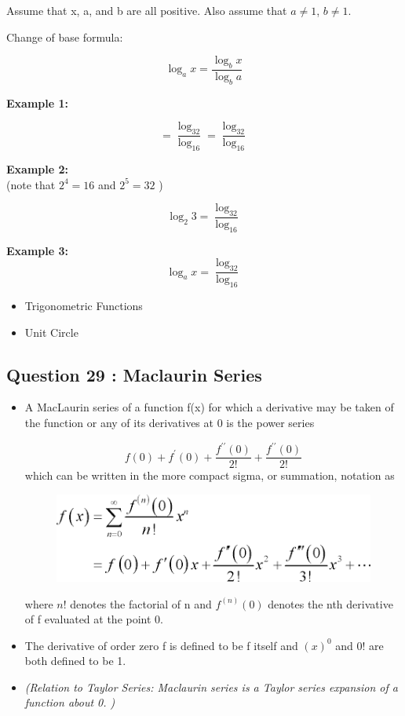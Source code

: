 \documentclass[]{article}
\begin{document}
	
	
	Assume that x, a, and b are all positive. Also assume that $a \neq 1$, $b \neq 1$.
	
	Change of base formula: 
	
	\[  \log_a x =  \frac{\log_{b} x }{ \log_{b} a } \]
	
	\noindent \textbf{Example 1: }
	
	\[  =  \frac{\log_{32} }{ \log_{16} }  =  \frac{\log_{32} }{ \log_{16} } \]
	
	\noindent \textbf{Example 2:  }  \\ (note that $2^{4} = 16$ and $2^{5} = 32$ )
	
	\[  \log_2 3 =  \frac{\log_{32} }{ \log_{16} } \]
	
	
	\noindent \textbf{Example 3: }
	\[  \log_a x =  \frac{\log_{32} }{ \log_{16} } \]
	
	
	
	\bigskip
	
	
	\begin{itemize}
		\item	Trigonometric Functions
		\item   Unit Circle
		
	\end{itemize}

\subsection*{Question 29 : Maclaurin Series}
\begin{itemize}
	\item A MacLaurin series of a function f(x) for which a derivative may be taken of the function or any of its derivatives at 0 is the power series
	
	
	\[f(0) + f^{\prime}(0) + \frac{f^{\prime \prime}(0)}{2!} + \frac{f^{\prime \prime}(0)}{2!} \]
	which can be written in the more compact sigma, or summation, notation as
	\begin{figure}[h!]
		\centering
		\includegraphics[width=0.25\linewidth]{MaclaurinFormula.png}
	\end{figure}
	
	where $n!$ denotes the factorial of n and $f^{(n)}(0)$ denotes the nth derivative of f evaluated at the point 0. 
	\item The derivative of order zero f is defined to be f itself and $(x)^0$ and 0! are both defined to be 1.
	\item \textit{(Relation to Taylor Series: Maclaurin series is a Taylor series expansion of a function about 0. )}
	
\end{itemize}
\end{document}
